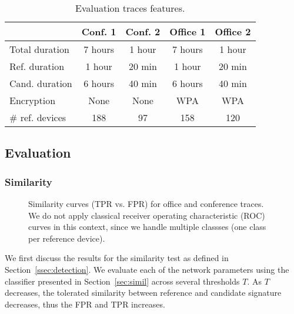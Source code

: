 \documentclass[10pt, conference, compsocconf, letterpaper]{IEEEtran}
\begin{document}
\begin{table}
{\footnotesize
\begin{center}
\begin{tabular}{l|c|c|c|c}
 & Conf. 1& Conf. 2& Office 1 & Office 2 \\
 \hline
 Total duration & 7 hours & 1 hour& 7 hours & 1 hour \\
 Ref. duration & 1 hour & 20 min& 1 hour & 20 min \\
 Cand. duration & 6 hours & 40 min & 6 hours & 40 min \\
 Encryption & None & None& WPA & WPA \\
\# ref. devices & 188 & 97 & 158 & 120\\
\end{tabular}
\caption{Evaluation traces features.}
\label{tab:traces}
\end{center}
}
\end{table}


\subsection{Evaluation}


\subsubsection{Similarity}

\begin{figure}
\centerline{
}
\hfil
\centerline{
}
\hfil
\centerline{
}
\hfil
\centerline{
}
\caption{Similarity curves (TPR vs. FPR) for office and conference traces. We do not apply  classical receiver operating characteristic (ROC) curves in this context, since we handle multiple classses (one class per reference device).}
\label{fig:SimFPRvsTPR}
\end{figure}


We first discuss the results for the similarity test as defined in Section~\ref{ssec:detection}.
We evaluate each of the network parameters using the classifier presented in Section~\ref{sec:simil} across several thresholds $T$. As $T$ decreases, the tolerated similarity between reference and candidate signature decreases, thus the FPR and TPR increases.
\end{document}
